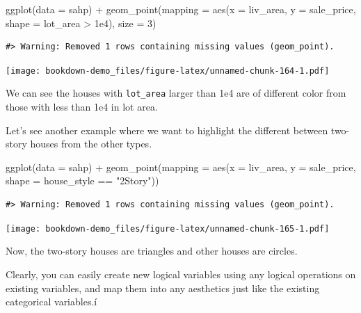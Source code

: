 \documentclass[
]{book}
\newenvironment{Shaded}{\begin{snugshade}}{\end{snugshade}}
\newcommand{\AttributeTok}[1]{\textcolor[rgb]{0.77,0.63,0.00}{#1}}
\newcommand{\DecValTok}[1]{\textcolor[rgb]{0.00,0.00,0.81}{#1}}
\newcommand{\FloatTok}[1]{\textcolor[rgb]{0.00,0.00,0.81}{#1}}
\newcommand{\FunctionTok}[1]{\textcolor[rgb]{0.00,0.00,0.00}{#1}}
\newcommand{\NormalTok}[1]{#1}
\newcommand{\SpecialCharTok}[1]{\textcolor[rgb]{0.00,0.00,0.00}{#1}}
\newcommand{\StringTok}[1]{\textcolor[rgb]{0.31,0.60,0.02}{#1}}
\begin{document}
\begin{Shaded}
\begin{Highlighting}[]
\FunctionTok{ggplot}\NormalTok{(}\AttributeTok{data =}\NormalTok{ sahp) }\SpecialCharTok{+} \FunctionTok{geom\_point}\NormalTok{(}\AttributeTok{mapping =} \FunctionTok{aes}\NormalTok{(}\AttributeTok{x =}\NormalTok{ liv\_area, }\AttributeTok{y =}\NormalTok{ sale\_price, }\AttributeTok{shape =}\NormalTok{ lot\_area }\SpecialCharTok{\textgreater{}} \FloatTok{1e4}\NormalTok{), }\AttributeTok{size =} \DecValTok{3}\NormalTok{)}
\end{Highlighting}
\end{Shaded}

\begin{verbatim}
#> Warning: Removed 1 rows containing missing values (geom_point).
\end{verbatim}

\texttt{[image: bookdown-demo\_files/figure-latex/unnamed-chunk-164-1.pdf]}

We can see the houses with \texttt{lot\_area} larger than 1e4 are of different color from those with less than 1e4 in lot area.

Let's see another example where we want to highlight the different between two-story houses from the other types.

\begin{Shaded}
\begin{Highlighting}[]
\FunctionTok{ggplot}\NormalTok{(}\AttributeTok{data =}\NormalTok{ sahp) }\SpecialCharTok{+} \FunctionTok{geom\_point}\NormalTok{(}\AttributeTok{mapping =} \FunctionTok{aes}\NormalTok{(}\AttributeTok{x =}\NormalTok{ liv\_area, }\AttributeTok{y =}\NormalTok{ sale\_price, }\AttributeTok{shape =}\NormalTok{ house\_style }\SpecialCharTok{==} \StringTok{"2Story"}\NormalTok{))}
\end{Highlighting}
\end{Shaded}

\begin{verbatim}
#> Warning: Removed 1 rows containing missing values (geom_point).
\end{verbatim}

\texttt{[image: bookdown-demo\_files/figure-latex/unnamed-chunk-165-1.pdf]}

Now, the two-story houses are triangles and other houses are circles.

Clearly, you can easily create new logical variables using any logical operations on existing variables, and map them into any aesthetics just like the existing categorical variables.í
\end{document}
